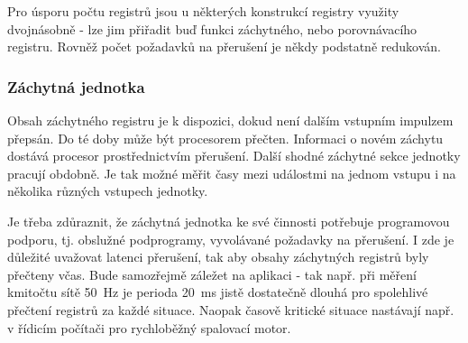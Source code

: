       Pro úsporu počtu registrů jsou u některých konstrukcí registry využity dvojnásobně - lze jim 
      přiřadit buď funkci záchytného, nebo porovnávacího registru. Rovněž počet požadavků na 
      přerušení je někdy podstatně redukován.

      \subsubsection{Záchytná jednotka}
        Obsah záchytného registru je k dispozici, dokud není dalším vstupním impulzem přepsán. Do 
        té doby může být procesorem přečten. Informaci o novém záchytu dostává procesor 
        prostřednictvím přerušení. Další shodné záchytné sekce jednotky pracují obdobně. Je tak 
        možné měřit časy mezi událostmi na jednom vstupu i na několika různých vstupech jednotky.
        
        Je třeba zdůraznit, že záchytná jednotka ke své činnosti potřebuje programovou podporu, tj. 
        obslužné podprogramy, vyvolávané požadavky na přerušení. I zde je důležité uvažovat latenci 
        přerušení, tak aby  obsahy záchytných registrů byly přečteny včas. Bude samozřejmě záležet 
        na aplikaci - tak např. při měření kmitočtu sítě \SI{50}{\hertz} je perioda 
        \SI{20}{\milli\second} jistě dostatečně dlouhá pro spolehlivé přečtení registrů za každé 
        situace. Naopak časově kritické situace nastávají např. v řídicím počítači pro rychloběžný 
        spalovací motor.
        
